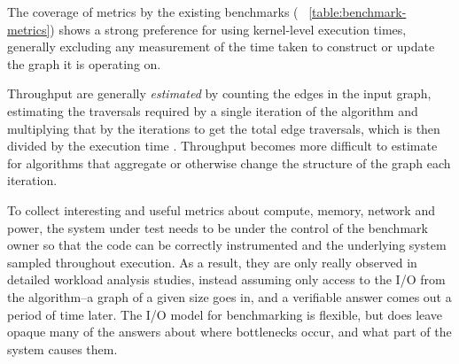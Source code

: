 
The coverage of metrics by the existing benchmarks ( ~\ref{table:benchmark-metrics}) shows a strong preference for using kernel-level execution times, generally excluding any measurement of the time taken to construct or update the graph it is operating on. 

Throughput  are generally \textit{estimated} by counting the edges in the input graph, estimating the traversals required by a single iteration of the algorithm and multiplying that by the  iterations to get the total edge traversals, which is then divided by the execution time .
Throughput becomes more difficult to estimate for algorithms that aggregate or otherwise change the structure of the graph each iteration. 

To collect interesting and useful metrics about compute, memory, network and power, the system under test needs to be under the control of the benchmark owner so that the code can be correctly instrumented and the underlying system sampled throughout execution. 
As a result,  they are only really observed in detailed workload analysis studies, instead assuming only access to the  I/O from the algorithm--a graph of a given size goes in, and a verifiable answer comes out a period of time later. 
The  I/O model for benchmarking is flexible, but  does leave opaque many of the answers about where bottlenecks occur, and what part of the system causes them. 

